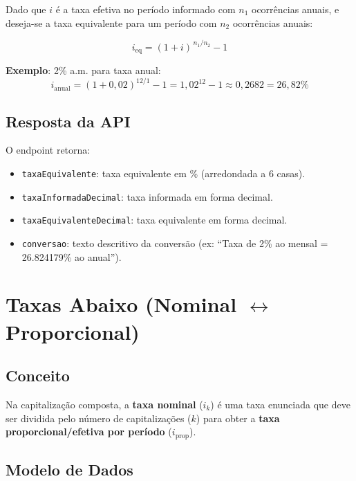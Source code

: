 \documentclass[12pt,a4paper]{article}
\begin{document}
\begin{tcolorbox}[colback=white,colframe=teal600,title=Fórmula --- Taxa Equivalente]

Dado que $i$ é a taxa efetiva no período informado com $n_1$ ocorrências anuais, e deseja-se a taxa equivalente para um período com $n_2$ ocorrências anuais:

\begin{equation}
  i_{\text{eq}} = (1 + i)^{\,n_1 / n_2} - 1
\end{equation}

\textbf{Exemplo}: 2\% a.m. para taxa anual:
\[
  i_{\text{anual}} = (1 + 0{,}02)^{12/1} - 1 = 1{,}02^{12} - 1 \approx 0{,}2682 = 26{,}82\%
\]

\end{tcolorbox}

\subsection{Resposta da API}

O endpoint retorna:
\begin{itemize}
  \item \texttt{taxaEquivalente}: taxa equivalente em \% (arredondada a 6 casas).
  \item \texttt{taxaInformadaDecimal}: taxa informada em forma decimal.
  \item \texttt{taxaEquivalenteDecimal}: taxa equivalente em forma decimal.
  \item \texttt{conversao}: texto descritivo da conversão (ex: ``Taxa de 2\% ao mensal = 26.824179\% ao anual'').
\end{itemize}

\section{Taxas Abaixo (Nominal $\leftrightarrow$ Proporcional)}
\label{sec:abaixo}

\subsection{Conceito}

Na capitalização composta, a \textbf{taxa nominal} ($i_k$) é uma taxa enunciada que deve ser dividida pelo número de capitalizações ($k$) para obter a \textbf{taxa proporcional/efetiva por período} ($i_{\text{prop}}$).

\subsection{Modelo de Dados}
\end{document}
